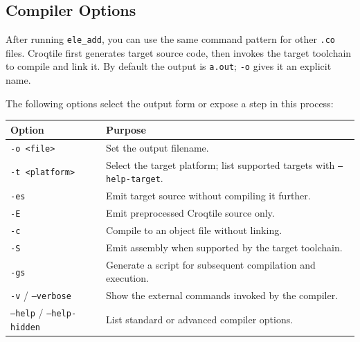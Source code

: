 \subsection*{Compiler Options}

After running \texttt{ele\_add}, you can use the same command pattern for other \texttt{.co} files. Croqtile first generates target source code, then invokes the target toolchain to compile and link it. By default the output is \texttt{a.out}; \texttt{-o} gives it an explicit name.

The following options select the output form or expose a step in this process:

\begin{table}[htbp]
\centering\small
\begin{tabularx}{\linewidth}{@{}lX@{}}
\toprule
\textbf{Option} & \textbf{Purpose} \\
\midrule
\texttt{-\allowbreak{}o \textless{}file\textgreater{}} & Set the output filename. \\
\texttt{-\allowbreak{}t \textless{}platform\textgreater{}} & Select the target platform; list supported targets with \texttt{--help-target}. \\
\texttt{-es} & Emit target source without compiling it further. \\
\texttt{-E} & Emit preprocessed Croqtile source only. \\
\texttt{-c} & Compile to an object file without linking. \\
\texttt{-S} & Emit assembly when supported by the target toolchain. \\
\texttt{-gs} & Generate a script for subsequent compilation and execution. \\
\texttt{-v} / \texttt{--verbose} & Show the external commands invoked by the compiler. \\
\texttt{--help} / \texttt{--help-hidden} & List standard or advanced compiler options. \\
\bottomrule
\end{tabularx}
\end{table}
